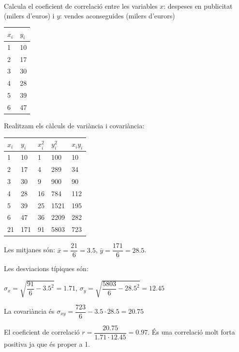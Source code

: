 \begin{resolt}{
	Calcula el coeficient de correlació entre les variables $x$: despeses en publicitat (milers d'euros) i $y$: vendes aconseguides (milers d'eurors)
	\vspace{0.25cm}
	
	\begin{tabular}{|p{0.7in}|p{0.7in}|}
	 \hline
	$x_i$ & $y_i$ \\ \hline
	1 & 10\\ \hline
	2 & 17 \\ \hline
	3 & 30\\ \hline
	4 & 28\\ \hline
	5 & 39\\ \hline
	6 & 47\\ \hline	 
\end{tabular}
}
Realitzam els càlculs de variància i covariància:\vspace{0.25cm}

\begin{tabular}{|p{0.7in}|p{0.7in}|p{0.7in}|p{0.7in}|p{0.7in}|} \hline
	
	$x_i$ & $y_i$ & $x_i^2$ & $y_i^2$ & $x_i y_i$ \\ \hline
	1 & 10 & 1 & 100  & 10 \\ \hline
	2 & 17 & 4 & 289 & 34 \\ \hline
	3 & 30 & 9 & 900 &  90 \\ \hline
	4 & 28 & 16 & 784 &  112\\ \hline
	5 & 39 & 25  & 1521 & 195 \\ \hline
	6 & 47 & 36  & 2209  &  282\\ \hline
	\rowcolor{lightgray} 21 & 171 & 91 & 5803 & 723 \\ \hline
\end{tabular}
\vspace{0.25cm}

Les mitjanes són: $\bar x = \dfrac{21}{6}=3.5$, $\bar y = \dfrac{171}{6}=28.5$.\vspace{0.25cm}

Les desviacions típiques són:
\begin{center}
	$\sigma_x = \sqrt{ \dfrac{91}{6} - 3.5^2}=1.71$, 
	$\sigma_y = \sqrt{ \dfrac{5803}{6} - 28.5^2}=12.45$\vspace{0.25cm}
\end{center}

La covariància és   $\sigma_{xy} = \dfrac{723}{6} - 3.5 \cdot 28.5 = 20.75$ \vspace{0.25cm}

El coeficient de correlació $r = \dfrac{20.75}{1.71 \cdot 12.45}=0.97$. És una correlació molt forta positiva ja que és proper a 1. \vspace{0.25cm}

\end{resolt}
\vspace{0.5cm}


